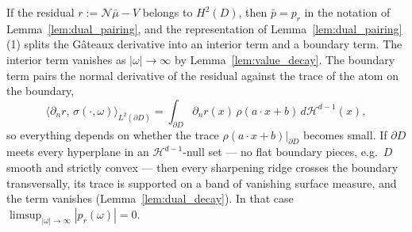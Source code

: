 \documentclass[11pt]{amsart}
\theoremstyle{definition}
\theoremstyle{remark}
\begin{document}
If the residual $r := \mathcal{N}\bar{\mu} - V$ belongs to $H^2(D)$, then
$\bar{p} = p_r$ in the notation of Lemma~\ref{lem:dual_pairing}, and the
representation of Lemma~\ref{lem:dual_pairing}(1) splits the G\^ateaux derivative into an interior
term and a boundary term. The interior term vanishes as
$|\omega| \rightarrow \infty$ by Lemma~\ref{lem:value_decay}. The boundary
term pairs the normal derivative of the residual against the trace of
the atom on the boundary,
\begin{equation*}
	\langle \partial_n r, \, \sigma(\cdot, \omega) \rangle_{L^2(\partial D)}
	= \int_{\partial D} \partial_n r(x) \, \rho(a \cdot x + b) \, d\mathcal{H}^{d-1}(x),
\end{equation*}
so everything depends on whether the trace $\rho(a \cdot x + b)|_{\partial D}$
becomes small. If $\partial D$ meets every hyperplane in an
$\mathcal{H}^{d-1}$-null set --- no flat boundary pieces, e.g.\ $D$ smooth and 
strictly convex --- then every sharpening ridge crosses the boundary
transversally, its trace is supported on a band of vanishing surface measure,
and the term vanishes (Lemma~\ref{lem:dual_decay}). In that case
$\limsup_{|\omega| \rightarrow \infty} |p_r(\omega)| = 0$.
\end{document}
